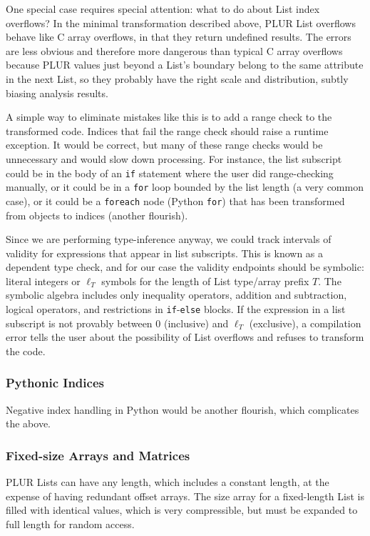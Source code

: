 \documentclass[10pt, conference, compsocconf]{IEEEtran}
\begin{document}
One special case requires special attention: what to do about List index overflows? In the minimal transformation described above, PLUR List overflows behave like C array overflows, in that they return undefined results. The errors are less obvious and therefore more dangerous than typical C array overflows because PLUR values just beyond a List's boundary belong to the same attribute in the next List, so they probably have the right scale and distribution, subtly biasing analysis results.

A simple way to eliminate mistakes like this is to add a range check to the transformed code. Indices that fail the range check should raise a runtime exception. It would be correct, but many of these range checks would be unnecessary and would slow down processing. For instance, the list subscript could be in the body of an {\tt if} statement where the user did range-checking manually, or it could be in a {\tt for} loop bounded by the list length (a very common case), or it could be a {\tt foreach} node (Python {\tt for}) that has been transformed from objects to indices (another flourish).

Since we are performing type-inference anyway, we could track intervals of validity for expressions that appear in list subscripts. This is known as a dependent type check, and for our case the validity endpoints should be symbolic: literal integers or $\ell_T$ symbols for the length of List type/array prefix $T$. The symbolic algebra includes only inequality operators, addition and subtraction, logical operators, and restrictions in {\tt if}-{\tt else} blocks. If the expression in a list subscript is not provably between 0 (inclusive) and $\ell_T$ (exclusive), a compilation error tells the user about the possibility of List overflows and refuses to transform the code.

\subsubsection{Pythonic Indices}

Negative index handling in Python would be another flourish, which complicates the above.

\subsubsection{Fixed-size Arrays and Matrices}

PLUR Lists can have any length, which includes a constant length, at the expense of having redundant offset arrays. The size array for a fixed-length List is filled with identical values, which is very compressible, but must be expanded to full length for random access.
\end{document}
